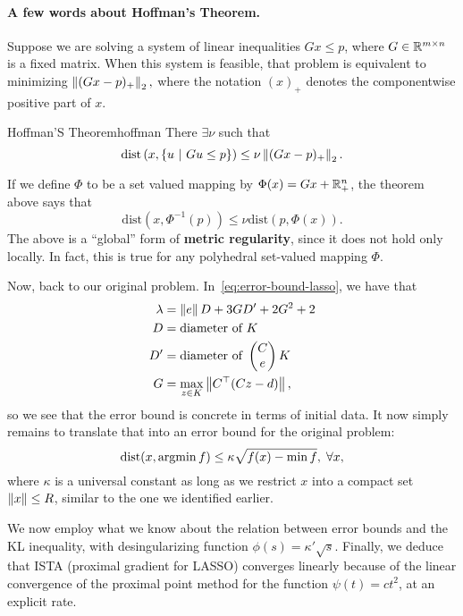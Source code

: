\paragraph{A few words about Hoffman's Theorem.} Suppose we are solving a
system of linear inequalities $Gx \leq p$, where $G \in \mathbb{R}^{m \times n}$ is a
fixed matrix. When this system is feasible, that problem is equivalent to
minimizing
\(
	\left \| (Gx - p)_+ \right \|_2,
\)
where the notation $(x)_+$ denotes the componentwise positive part of $x$.
\begin{ctheorem}{Hoffman'S Theorem}{hoffman}
	There $\exists \nu$ such that
	\[
		\mathrm{dist}\left(x, \left\{ u \ \middle| \  Gu \leq p \right\}\right)
		\leq \nu \left \| (Gx - p)_+ \right \|_2.
	\]
\end{ctheorem}
If we define $\Phi$ to be a set valued mapping by $\Phi(x) = Gx + \mathbb{R}_+^n$,
the theorem above says that
\[
	\mathrm{dist}\left(x, \Phi^{-1}(p)\right) \leq \nu \mathrm{dist}(p,
	\Phi(x)).
\]
The above is a ``global'' form of \textbf{metric regularity}, since it does not
hold only locally. In fact, this is true for any polyhedral set-valued mapping
$\Phi$.

Now, back to our original problem. In~\cref{eq:error-bound-lasso}, we have that
\begin{align*}
	\lambda &= \left \| e \right \| D + 3 G D' + 2 G^2 + 2 \\
	D &= \text{diameter of } K \\
	D' &= \text{diameter of } \begin{pmatrix} C \\ e \end{pmatrix} K \\
	G &= \max_{z \in K} \left \| C^\top (Cz - d) \right \|,
\end{align*}
so we see that the error bound is concrete in terms of initial data. It now
simply remains to translate that into an error bound for the original problem:
\[
	\mathrm{dist}(x, \operatorname*{argmin} f) \leq
	\kappa \sqrt{f(x) - \min f}, \; \forall x,
\]
where $\kappa$ is a universal constant as long as we restrict $x$ into a
compact set $\left \| x \right \| \leq R$, similar to the one we identified earlier.

We now employ what we know about the relation between error bounds and the KL
inequality, with desingularizing function $\phi(s) = \kappa' \sqrt{s}$.
Finally, we deduce that ISTA (proximal gradient for LASSO) converges linearly
because of the linear convergence of the proximal point method for the function
$\psi(t) = c t^2$, at an explicit rate.

